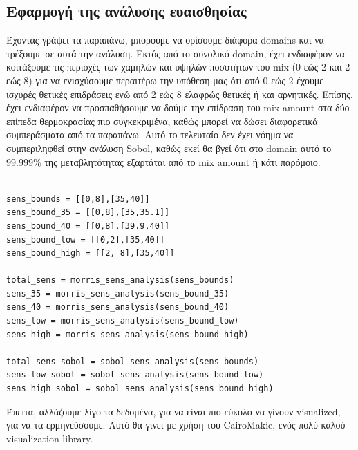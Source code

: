 \documentclass[11pt]{article}
\begin{document}
\subsection{Εφαρμογή της ανάλυσης ευαισθησίας}
\label{sec:orgd6efff8}
Έχοντας γράψει τα παραπάνω, μπορούμε να ορίσουμε διάφορα domains και να τρέξουμε σε αυτά την ανάλυση. Εκτός από το συνολικό domain, έχει ενδιαφέρον να κοιτάξουμε τις περιοχές των χαμηλών και υψηλών ποσοτήτων του mix (0 εώς 2 και 2 εώς 8) για να ενισχύσουμε περαιτέρω την υπόθεση μας ότι από 0 εώς 2 έχουμε ισχυρές θετικές επιδράσεις ενώ από 2 εώς 8 ελαφρώς θετικές ή και αρνητικές. Επίσης, έχει ενδιαφέρον να προσπαθήσουμε να δούμε την επίδραση του mix amount στα δύο επίπεδα θερμοκρασίας πιο συγκεκριμένα, καθώς μπορεί να δώσει διαφορετικά συμπεράσματα από τα παραπάνω. Αυτό το τελευταίο δεν έχει νόημα να συμπεριληφθεί στην ανάλυση Sobol, καθώς εκεί θα βγεί ότι στο domain αυτό το 99.999\% της μεταβλητότητας εξαρτάται από το mix amount ή κάτι παρόμοιο.

\begin{verbatim}

sens_bounds = [[0,8],[35,40]]
sens_bound_35 = [[0,8],[35,35.1]]
sens_bound_40 = [[0,8],[39.9,40]]
sens_bound_low = [[0,2],[35,40]]
sens_bound_high = [[2, 8],[35,40]]

total_sens = morris_sens_analysis(sens_bounds)
sens_35 = morris_sens_analysis(sens_bound_35)
sens_40 = morris_sens_analysis(sens_bound_40)
sens_low = morris_sens_analysis(sens_bound_low)
sens_high = morris_sens_analysis(sens_bound_high)

total_sens_sobol = sobol_sens_analysis(sens_bounds)
sens_low_sobol = sobol_sens_analysis(sens_bound_low)
sens_high_sobol = sobol_sens_analysis(sens_bound_high)

\end{verbatim}

Έπειτα, αλλάζουμε λίγο τα δεδομένα, για να είναι πιο εύκολο να γίνουν visualized, για να τα ερμηνεύσουμε. Αυτό θα γίνει με χρήση του CairoMakie, ενός πολύ καλού visualization library.
\end{document}
